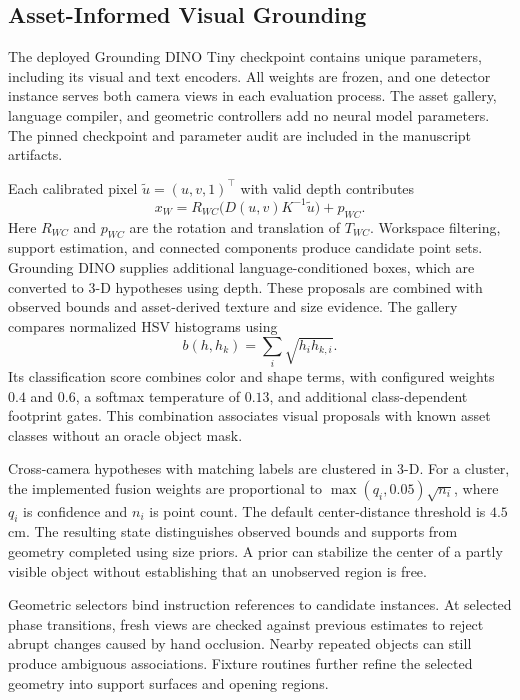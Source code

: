 \documentclass[letterpaper,10pt,conference]{ieeeconf}
\begin{document}
\subsection{Asset-Informed Visual Grounding}
The deployed Grounding DINO Tiny checkpoint contains
\NeuralParameters{} unique parameters, including its visual and text
encoders. All weights are frozen, and one detector instance serves both
camera views in each evaluation process. The asset gallery, language
compiler, and geometric controllers add no neural model parameters.
The pinned checkpoint and parameter audit are included in the manuscript
artifacts.

Each calibrated pixel $\tilde u=(u,v,1)^\top$ with valid depth contributes
\begin{equation}
 x_W=R_{WC}\big(D(u,v)K^{-1}\tilde u\big)+p_{WC}.
 \label{eq:backproject}
\end{equation}
Here $R_{WC}$ and $p_{WC}$ are the rotation and translation of $T_{WC}$.
Workspace filtering, support estimation, and connected components produce
candidate point sets. Grounding DINO supplies additional language-conditioned
boxes, which are converted to 3-D hypotheses using depth. These proposals
are combined with observed bounds and asset-derived texture and size
evidence. The gallery compares normalized HSV histograms using
\begin{equation}
 b(h,h_k)=\sum_i\sqrt{h_i h_{k,i}}.
\end{equation}
Its classification score combines color and shape terms,
with configured weights $0.4$ and $0.6$, a softmax temperature of $0.13$,
and additional class-dependent footprint gates. This combination associates
visual proposals with known asset classes without an oracle object mask.

Cross-camera hypotheses with matching labels are clustered in 3-D. For a
cluster, the implemented fusion weights are proportional to
$\max(q_i,0.05)\sqrt{n_i}$, where $q_i$ is confidence and $n_i$ is point
count. The default center-distance threshold is $4.5$\,cm.
The resulting state distinguishes observed bounds and supports from geometry
completed using size priors. A prior can stabilize the center of a partly
visible object without establishing that an unobserved region is free.

Geometric selectors bind instruction references to candidate instances.
At selected phase transitions, fresh views are checked against previous
estimates to reject abrupt changes caused by hand occlusion. Nearby repeated
objects can still produce ambiguous associations. Fixture routines further
refine the selected geometry into support surfaces and opening regions.
\end{document}
